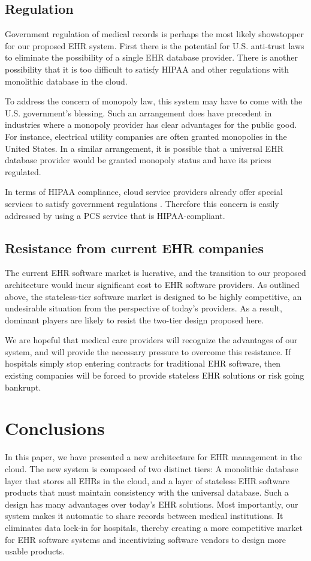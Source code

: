 \subsection{Regulation}
Government regulation of medical records is perhaps the most likely showstopper for our proposed EHR system. First there is the potential for U.S. anti-trust laws to eliminate the possibility of a single EHR database provider. There is another possibility that it is too difficult to satisfy HIPAA and other regulations with monolithic database in the cloud.

To address the concern of monopoly law, this system may have to come with the U.S. government's blessing. Such an arrangement does have precedent in industries where a monopoly provider has clear advantages for the public good. For instance, electrical utility companies are often granted monopolies in the United States. In a similar arrangement, it is possible that a universal EHR database provider would be granted monopoly status and have its prices regulated.

In terms of HIPAA compliance, cloud service providers already offer special services to satisfy government regulations \cite{HIPAA}. Therefore this concern is easily addressed by using a PCS service that is HIPAA-compliant.

\subsection{Resistance from current EHR companies}
The current EHR software market is lucrative, and the transition to our proposed architecture would incur significant cost to EHR software providers. As outlined above, the stateless-tier software market is designed to be highly competitive, an undesirable situation from the perspective of today's providers. As a result, dominant players are likely to resist the two-tier design proposed here.

We are hopeful that medical care providers will recognize the advantages of our system, and will provide the necessary pressure to overcome this resistance. If hospitals simply stop entering contracts for traditional EHR software, then existing companies will be forced to provide stateless EHR solutions or risk going bankrupt.

\section{Conclusions}\label{sec:conclusion}
In this paper, we have presented a new architecture for EHR management in the cloud. The new system is composed of two distinct tiers: A monolithic database layer that stores all EHRs in the cloud, and a layer of stateless EHR software products that must maintain consistency with the universal database. Such a design has many advantages over today's EHR solutions. Most importantly, our system makes it automatic to share records between medical institutions. It eliminates data lock-in for hospitals, thereby creating a more competitive market for EHR software systems and incentivizing software vendors to design more usable products.

